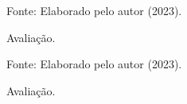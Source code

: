 \documentclass[
	12pt,				%
	openright,			%
	oneside,			%
	a4paper,			%
	english,			%
	french,				%
	spanish,			%
	brazil,				%
	]{abntex2}
\begin{document}
\begin{figure}[ht]
    \centering
    \caption{Avaliação.}
    \label{fig: grafico-acc}
    
    \centering \small Fonte: Elaborado pelo autor (2023).
\end{figure}

\begin{figure}[ht]
    \centering
    \caption{Avaliação.}
    \label{fig: grafico-acc}
    
    \centering \small Fonte: Elaborado pelo autor (2023).
\end{figure}
\end{document}
